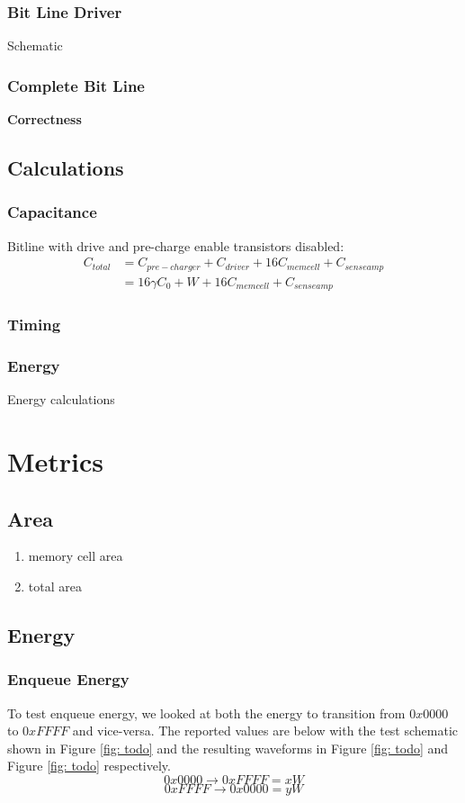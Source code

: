 \documentclass[a4paper]{article}
\begin{document}
\subsubsection{Bit Line Driver}
Schematic
\subsubsection{Complete Bit Line}
\textbf{Correctness}

\subsection{Calculations}
\subsubsection{Capacitance}
Bitline with drive and pre-charge enable transistors disabled:
\begin{align*}
C_{total} &= C_{pre-charger} + C_{driver} + 16 C_{memcell} + C_{senseamp}\\
&= 16 \gamma C_0 + W_{} + 16 C_{memcell} + C_{senseamp}
\end{align*}

\subsubsection{Timing}

\subsubsection{Energy}
Energy calculations



\section{Metrics}
\label{sec:mtrics}

\subsection{Area}
\begin{enumerate}
\item memory cell area
\item total area
\end{enumerate}

\subsection{Energy}
\subsubsection{Enqueue Energy}
To test enqueue energy, we looked at both the energy to transition from $0x0000$ to $0xFFFF$ and vice-versa. The reported values are below with the test schematic shown in Figure \ref{fig: todo} and the resulting waveforms in Figure \ref{fig: todo} and Figure \ref{fig: todo} respectively.
$$0x0000 \rightarrow 0xFFFF = xW$$
$$0xFFFF \rightarrow 0x0000 = yW$$
\end{document}
